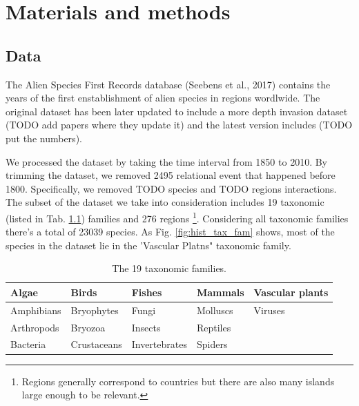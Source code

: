 \documentclass[mscthesis]{usiinfthesis}
\begin{document}
\chapter{Materials and methods}

\section{Data}

The Alien Species First Records database (Seebens et al., 2017) contains the years of the first enstablishment of alien species in regions wordlwide. The original dataset has been later updated to include a more depth invasion dataset (TODO add papers where they update it) and the latest version includes (TODO put the numbers). 

We processed the dataset by taking the time interval from 1850 to 2010. By trimming the dataset, we removed 2495 relational event that happened before 1800. Specifically, we removed TODO species and TODO regions interactions. The subset of the dataset we take into consideration includes 19 taxonomic (listed in Tab. \ref{table:families}) families and 276 regions \footnote{Regions generally correspond to countries but there are also many islands large enough to be relevant.}. Considering all taxonomic families there's a total of 23039 species. As Fig. \ref{fig:hist_tax_fam} shows, most of the species in the dataset lie in the 'Vascular Platns" taxonomic family.

\begin{table}[H]
\centering
\begin{tabular}{|l|l|l|l|l|}
\hline
Algae      & Birds       & Fishes        & Mammals  & Vascular plants \\ \hline
Amphibians & Bryophytes  & Fungi         & Molluscs & Viruses         \\ \hline
Arthropods & Bryozoa     & Insects       & Reptiles &                 \\ \hline
Bacteria   & Crustaceans & Invertebrates & Spiders  &                 \\ \hline             
\end{tabular}
\caption{The 19 taxonomic families.}
\label{table:families}
\end{table}
\end{document}
